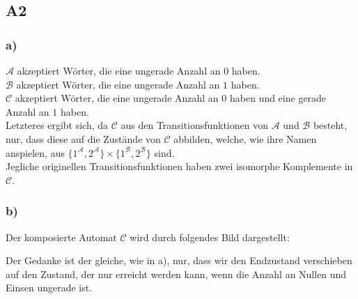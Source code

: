 \documentclass[12pt, a4paper]{article}
\begin{document}
\subsection*{A2}
\subsubsection*{a)}
\(\mathcal{A}\) akzeptiert Wörter, die eine ungerade Anzahl an \(0\) haben. \\
\(\mathcal{B}\) akzeptiert Wörter, die eine ungerade Anzahl an \(1\) haben. \\
\(\mathcal{C}\) akzeptiert Wörter, die eine ungerade Anzahl an \(0\) haben und eine gerade Anzahl an \(1\) haben.\\
Letzteres ergibt sich, da \(\mathcal{C}\) aus den Transitionsfunktionen von \(\mathcal{A}\) und \(\mathcal{B}\) besteht, nur, dass diese auf die Zustände von \(\mathcal{C}\) abbilden, welche, wie ihre Namen anspielen, aus \(\{1^\mathcal A, 2^\mathcal A\} \times \{1^\mathcal B, 2^\mathcal B\}\) sind. \\
Jegliche originellen Transitionsfunktionen haben zwei isomorphe Komplemente in \(\mathcal{C}\).
\subsubsection*{b)}
Der komposierte Automat \(\mathcal{C}\) wird durch folgendes Bild dargestellt:
\begin{center}
\end{center}
Der Gedanke ist der gleiche, wie in a), nur, dass wir den Endzustand verschieben auf den Zustand, der nur erreicht werden kann, wenn die Anzahl an Nullen und Einsen ungerade ist.
\end{document}
